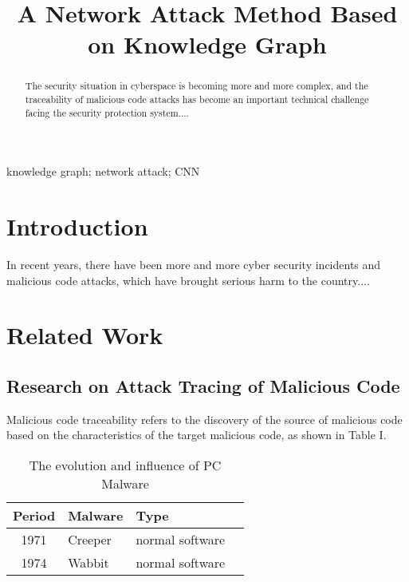 \documentclass[conference]{IEEEtran}
\begin{document}
\graphicspath{{figures/}}

\title{A Network Attack Method Based on Knowledge Graph\\}

\author{
}

\maketitle

\begin{abstract}
The security situation in cyberspace is becoming more and more complex, and the traceability of malicious code attacks has become an important technical challenge facing the security protection system....
\end{abstract}

\begin{IEEEkeywords}
knowledge graph; network attack; CNN
\end{IEEEkeywords}

\section{Introduction}
In recent years, there have been more and more cyber security incidents and malicious code attacks, which have brought serious harm to the country....

\section{Related Work}

\subsection{Research on Attack Tracing of Malicious Code}

Malicious code traceability refers to the discovery of the source of malicious code based on the characteristics of the target malicious code, as shown in Table I.

\begin{table}[htbp]
	\caption{The evolution and influence of PC Malware}
	\centering
	\begin{center}
		\begin{tabular}{cllp{6cm}}
			\hline
			Period & Malware & Type\\
			\hline
			1971 & Creeper & normal software \\
			1974 & Wabbit & normal software \\
			\hline
		\end{tabular}
		\label{tab1}
	\end{center}
\end{table}
\end{document}
